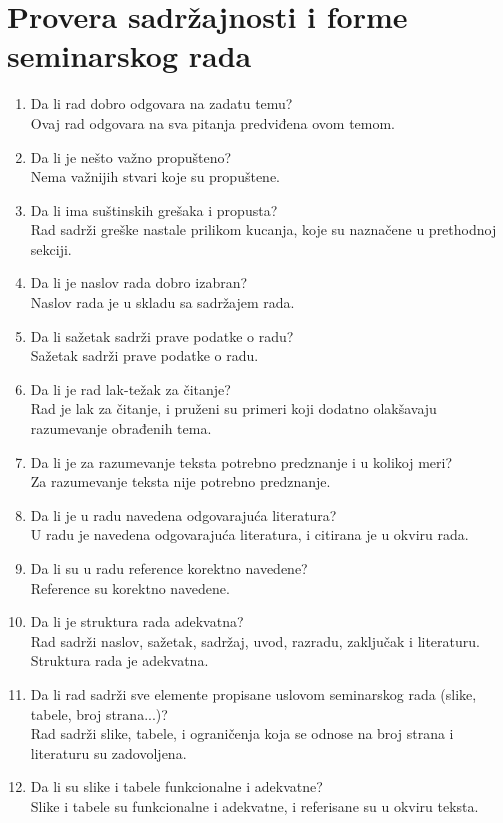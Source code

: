 \documentclass[a4paper]{report}
\begin{document}
\section{Provera sadržajnosti i forme seminarskog rada}

\begin{enumerate}
\item Da li rad dobro odgovara na zadatu temu?\\
Ovaj rad odgovara na sva pitanja predviđena ovom temom.
\item Da li je nešto važno propušteno?\\
Nema važnijih stvari koje su propuštene.
\item Da li ima suštinskih grešaka i propusta?\\
Rad sadrži greške nastale prilikom kucanja, koje su naznačene u prethodnoj sekciji.
\item Da li je naslov rada dobro izabran?\\
Naslov rada je u skladu sa sadržajem rada.
\item Da li sažetak sadrži prave podatke o radu?\\
Sažetak sadrži prave podatke o radu.
\item Da li je rad lak-težak za čitanje?\\
Rad je lak za čitanje, i pruženi su primeri koji dodatno olakšavaju razumevanje obrađenih tema.
\item Da li je za razumevanje teksta potrebno predznanje i u kolikoj meri?\\
Za razumevanje teksta nije potrebno predznanje.
\item Da li je u radu navedena odgovarajuća literatura?\\
U radu je navedena odgovarajuća literatura, i citirana je u okviru rada.
\item Da li su u radu reference korektno navedene?\\
Reference su korektno navedene.
\item Da li je struktura rada adekvatna?\\
Rad sadrži naslov, sažetak, sadržaj, uvod, razradu, zaključak i literaturu. Struktura rada je adekvatna.
\item Da li rad sadrži sve elemente propisane uslovom seminarskog rada (slike, tabele, broj strana...)?\\
Rad sadrži slike, tabele, i ograničenja koja se odnose na broj strana i literaturu su zadovoljena.
\item Da li su slike i tabele funkcionalne i adekvatne?\\
Slike i tabele su funkcionalne i adekvatne, i referisane su u okviru teksta.
\end{enumerate}
\end{document}
